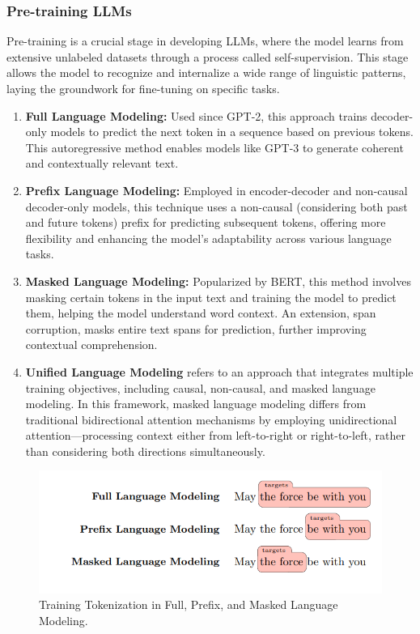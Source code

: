 \subsubsection*{Pre-training LLMs}
Pre-training is a crucial stage in developing  LLMs, where the model learns from extensive unlabeled datasets through a process called self-supervision\citep{wang2023language}. This stage allows the model to recognize and internalize a wide range of linguistic patterns, laying the groundwork for fine-tuning on specific tasks.
\begin{enumerate}
\item \textbf{Full Language Modeling:} Used since GPT-2, this approach trains decoder-only models to predict the next token in a sequence based on previous tokens. This autoregressive method enables models like GPT-3 to generate coherent and contextually relevant text.
\item \textbf{Prefix Language Modeling: }Employed in encoder-decoder and non-causal decoder-only models, this technique uses a non-causal (considering both past and future tokens) prefix for predicting subsequent tokens, offering more flexibility and enhancing the model's adaptability across various language tasks.
\item \textbf{Masked Language Modeling: }Popularized by BERT, this method involves masking certain tokens in the input text and training the model to predict them, helping the model understand word context. An extension, span corruption, masks entire text spans for prediction, further improving contextual comprehension.
\item \textbf{Unified Language Modeling} refers to an approach that integrates multiple training objectives, including causal, non-causal, and masked language modeling. In this framework, masked language modeling differs from traditional bidirectional attention mechanisms by employing unidirectional attention—processing context either from left-to-right or right-to-left, rather than considering both directions simultaneously\citep{dong2019unified}.
\end{enumerate}
\begin{figure}[h]
	\centering
	\includegraphics[width=0.6\linewidth]{Figures/pretraining.png}
	\caption{Training Tokenization in Full, Prefix, and Masked Language Modeling.}
\end{figure}
